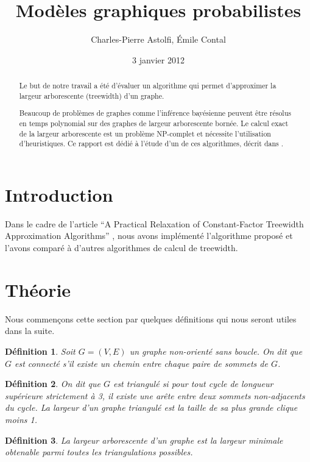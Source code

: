 \documentclass{article}
\title{Modèles graphiques probabilistes}
\author{Charles-Pierre Astolfi, Émile Contal}
\date{3 janvier 2012}
\begin{document}
\newtheorem*{mdef}{Définition}
\newtheorem*{mthm}{Théorème}

\maketitle

\begin{abstract}
Le but de notre travail a été d'évaluer un algorithme qui permet
d'approximer la largeur arborescente (treewidth) d'un graphe.

Beaucoup de problèmes de graphes comme l'inférence bayésienne peuvent
être résolus en temps polynomial sur des graphes de largeur
arborescente bornée. \cite{btwibn} 
Le calcul exact de la largeur arborescente est un
problème NP-complet et nécessite l'utilisation d'heuristiques. Ce
rapport est dédié à l'étude d'un de ces algorithmes, décrit dans
\cite{rootpaper}.

\end{abstract}

\section{Introduction}
Dans le cadre de l'article ``A Practical Relaxation of Constant-Factor
Treewidth Approximation Algorithms'' \cite{rootpaper}, nous avons
implémenté l'algorithme proposé et l'avons comparé à d'autres
algorithmes de calcul de treewidth.


\section{Théorie}

Nous commençons cette section par quelques définitions qui nous seront
utiles dans la suite.

\begin{mdef}
Soit $G = (V,E)$ un graphe non-orienté sans boucle. On dit que $G$ est
connecté s'il existe un chemin entre chaque paire de sommets de $G$.
\end{mdef}

\begin{mdef}
On dit que $G$ est triangulé si pour tout cycle de longueur supérieure
strictement à 3, il existe une arête entre deux sommets non-adjacents
du cycle. La largeur d'un graphe triangulé est la taille de sa plus
grande clique moins 1.
\end{mdef}

\begin{mdef}
La largeur arborescente d'un graphe est la largeur minimale obtenable
parmi toutes les triangulations possibles.
\end{mdef}
\end{document}
